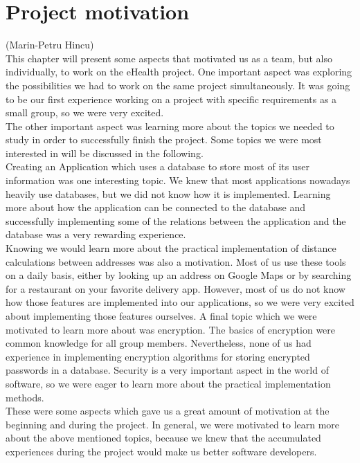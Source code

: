 \documentclass[a4paper, 12pt]{report}
\begin{document}
\chapter{Project motivation}
{\tiny (Marin-Petru Hincu)\\}
This chapter will present some aspects that motivated us as a team, but also individually, to work on the eHealth project.
One important aspect was exploring the possibilities we had to work on the same project simultaneously. It was going to be our first experience working on a project with specific requirements as a small group, so we were very excited. \\
The other important aspect was learning more about the topics we needed to study in order to successfully finish the project. Some topics we were most interested in will be discussed in the following.\\
Creating an Application which uses a database to store most of its user information was one interesting topic. We knew that most applications nowadays heavily use databases, but we did not know how it is implemented. Learning more about how the application can be connected to the database and successfully implementing some of the relations between the application and the database was a very rewarding experience. \\
Knowing we would learn more about the practical implementation of distance calculations between addresses was also a motivation. Most of us use these tools on a daily basis, either by looking up an address on Google Maps or by searching for a restaurant on your favorite delivery app. However, most of us do not know how those features are implemented into our applications, so we were very excited about implementing those features ourselves.
A final topic which we were motivated to learn more about was encryption. The basics of encryption were common knowledge for all group members. Nevertheless, none of us had experience in implementing encryption algorithms for storing encrypted passwords in a database. Security is a very important aspect in the world of software, so we were eager to learn more about the practical implementation methods. \\
These were some aspects which gave us a great amount of motivation at the beginning and during the project. In general, we were motivated to learn more about the above mentioned topics, because we knew that the accumulated experiences during the project would make us better software developers.
\end{document}

